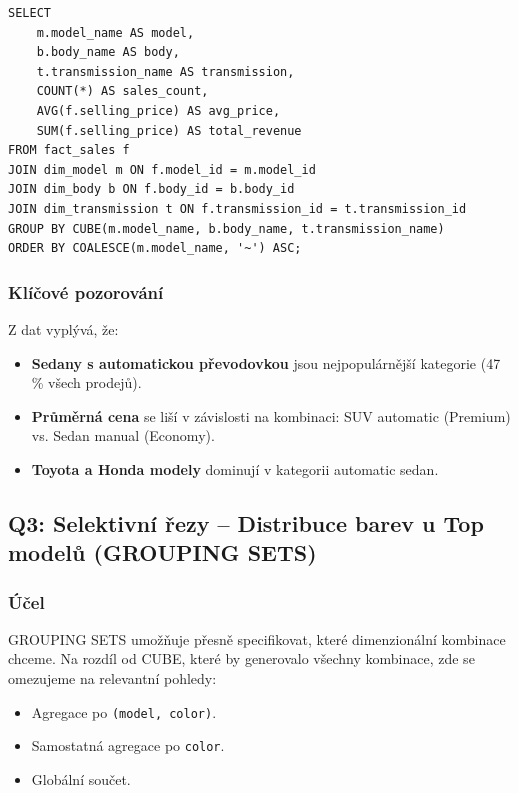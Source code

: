 \documentclass[12pt,a4paper]{article}
\begin{document}
\begin{lstlisting}[caption=Q2: CUBE – DuckDB verze]
SELECT 
    m.model_name AS model,
    b.body_name AS body,
    t.transmission_name AS transmission,
    COUNT(*) AS sales_count,
    AVG(f.selling_price) AS avg_price,
    SUM(f.selling_price) AS total_revenue
FROM fact_sales f
JOIN dim_model m ON f.model_id = m.model_id
JOIN dim_body b ON f.body_id = b.body_id
JOIN dim_transmission t ON f.transmission_id = t.transmission_id
GROUP BY CUBE(m.model_name, b.body_name, t.transmission_name)
ORDER BY COALESCE(m.model_name, '~') ASC;
\end{lstlisting}

\subsubsection{Klíčové pozorování}

Z dat vyplývá, že:
\begin{itemize}
    \item \textbf{Sedany s automatickou převodovkou} jsou nejpopulárnější kategorie (47 \% všech prodejů).
    \item \textbf{Průměrná cena} se liší v závislosti na kombinaci: SUV automatic (Premium) vs. Sedan manual (Economy).
    \item \textbf{Toyota a Honda modely} dominují v kategorii automatic sedan.
\end{itemize}

\subsection{Q3: Selektivní řezy – Distribuce barev u Top modelů (GROUPING SETS)}

\subsubsection{Účel}

GROUPING SETS umožňuje přesně specifikovat, které dimenzionální kombinace chceme. Na rozdíl od CUBE,
které by generovalo všechny kombinace, zde se omezujeme na relevantní pohledy:
\begin{itemize}
    \item Agregace po \texttt{(model, color)}.
    \item Samostatná agregace po \texttt{color}.
    \item Globální součet.
\end{itemize}
\end{document}
